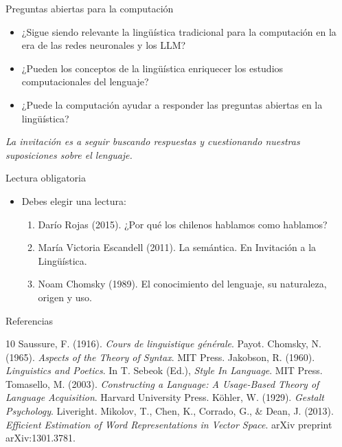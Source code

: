 \documentclass[handout]{beamer}
\begin{document}
\begin{frame}{Preguntas abiertas para la computación}
  \begin{itemize}
    \item ¿Sigue siendo relevante la lingüística tradicional para la computación en la era de las redes neuronales y los LLM?
    \item ¿Pueden los conceptos de la lingüística enriquecer los estudios computacionales del lenguaje?
    \item ¿Puede la computación ayudar a responder las preguntas abiertas en la lingüística?
\end{itemize}

  \vspace{8pt}
  \textit{La invitación es a seguir buscando respuestas y cuestionando nuestras suposiciones sobre el lenguaje.}
\end{frame}


\begin{frame}{Lectura obligatoria}
  \begin{itemize}
    \item Debes elegir una lectura:
      \begin{enumerate}
        \item Darío Rojas (2015). ¿Por qué los chilenos hablamos como hablamos?
        \item María Victoria Escandell (2011). La semántica. En Invitación a la Lingüística.
        \item Noam Chomsky (1989). El conocimiento del lenguaje, su naturaleza, origen y uso.
      \end{enumerate}
  \end{itemize}
\end{frame}

\begin{frame}{Referencias}
  \footnotesize
  \begin{thebibliography}{10}
     Saussure, F. (1916). \textit{Cours de linguistique générale}. Payot.
     Chomsky, N. (1965). \textit{Aspects of the Theory of Syntax}. MIT Press.
     Jakobson, R. (1960). \textit{Linguistics and Poetics}. In T. Sebeok (Ed.), \textit{Style In Language}. MIT Press.
     Tomasello, M. (2003). \textit{Constructing a Language: A Usage-Based Theory of Language Acquisition}. Harvard University Press.
     Köhler, W. (1929). \textit{Gestalt Psychology}. Liveright.
     Mikolov, T., Chen, K., Corrado, G., \& Dean, J. (2013). \textit{Efficient Estimation of Word Representations in Vector Space}. arXiv preprint arXiv:1301.3781.
  \end{thebibliography}
\end{frame}
\end{document}
